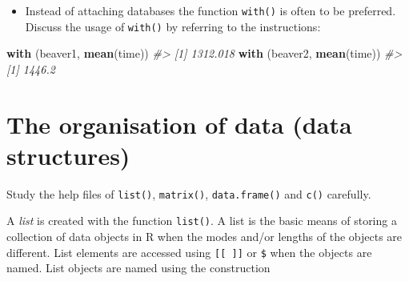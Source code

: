 \documentclass[
]{book}
\newenvironment{Shaded}{\begin{snugshade}}{\end{snugshade}}
\newcommand{\AttributeTok}[1]{\textcolor[rgb]{0.13,0.29,0.53}{#1}}
\newcommand{\CommentTok}[1]{\textcolor[rgb]{0.56,0.35,0.01}{\textit{#1}}}
\newcommand{\DecValTok}[1]{\textcolor[rgb]{0.00,0.00,0.81}{#1}}
\newcommand{\FunctionTok}[1]{\textcolor[rgb]{0.13,0.29,0.53}{\textbf{#1}}}
\newcommand{\NormalTok}[1]{#1}
\newcommand{\OtherTok}[1]{\textcolor[rgb]{0.56,0.35,0.01}{#1}}
\newcommand{\SpecialCharTok}[1]{\textcolor[rgb]{0.81,0.36,0.00}{\textbf{#1}}}
\providecommand{\tightlist}{%
  \setlength{\itemsep}{0pt}\setlength{\parskip}{0pt}}
\begin{document}
\begin{itemize}
\tightlist
\item
  Instead of attaching databases the function \texttt{with()} is often to be preferred. Discuss the usage of \texttt{with()} by referring to the instructions:
\end{itemize}

\begin{Shaded}
\begin{Highlighting}[]
\FunctionTok{with}\NormalTok{ (beaver1, }\FunctionTok{mean}\NormalTok{(time))}
\CommentTok{\#\textgreater{} [1] 1312.018}
\FunctionTok{with}\NormalTok{ (beaver2, }\FunctionTok{mean}\NormalTok{(time))}
\CommentTok{\#\textgreater{} [1] 1446.2}
\end{Highlighting}
\end{Shaded}

\section{The organisation of data (data structures)}\label{the-organisation-of-data-data-structures}

Study the help files of \texttt{list()}, \texttt{matrix()}, \texttt{data.frame()} and \texttt{c()} carefully.

A \emph{{list}} is created with the function \texttt{list()}. A list is the basic means of storing a collection of data objects in R when the modes and/or lengths of the objects are different. List elements are accessed using \texttt{{[}{[}\ {]}{]}} or \texttt{\$} when the objects are named. List objects are named using the construction

\begin{Shaded}
\end{Shaded}
\end{document}
